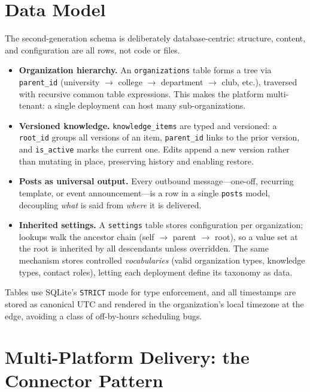 \documentclass[11pt,letterpaper]{article}
\newcommand{\code}[1]{\texttt{\small #1}}
\begin{document}
\section{Data Model}
\label{sec:data}

The second-generation schema is deliberately database-centric: structure, content, and
configuration are all rows, not code or files.

\begin{itemize}[leftmargin=1.4em,itemsep=3pt]
  \item \textbf{Organization hierarchy.} An \code{organizations} table forms a tree via
  \code{parent\_id} (university $\to$ college $\to$ department $\to$ club, etc.),
  traversed with recursive common table expressions. This makes the platform
  multi-tenant: a single deployment can host many sub-organizations.
  \item \textbf{Versioned knowledge.} \code{knowledge\_items} are typed and versioned:
  a \code{root\_id} groups all versions of an item, \code{parent\_id} links to the
  prior version, and \code{is\_active} marks the current one. Edits append a new
  version rather than mutating in place, preserving history and enabling restore.
  \item \textbf{Posts as universal output.} Every outbound message---one-off, recurring
  template, or event announcement---is a row in a single \code{posts} model, decoupling
  \emph{what} is said from \emph{where} it is delivered.
  \item \textbf{Inherited settings.} A \code{settings} table stores configuration per
  organization; lookups walk the ancestor chain (self $\to$ parent $\to$ root), so a
  value set at the root is inherited by all descendants unless overridden. The same
  mechanism stores controlled \emph{vocabularies} (valid organization types, knowledge
  types, contact roles), letting each deployment define its taxonomy as data.
\end{itemize}

\noindent
Tables use SQLite's \code{STRICT} mode for type enforcement, and all timestamps are
stored as canonical UTC and rendered in the organization's local timezone at the edge,
avoiding a class of off-by-hours scheduling bugs.

\section{Multi-Platform Delivery: the Connector Pattern}
\label{sec:connectors}
\end{document}
